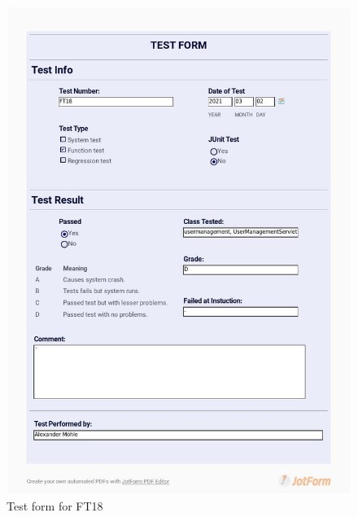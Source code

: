 \documentclass{article}
\begin{document}
 \begin{figure}
     \centering
     \includegraphics[width=13cm]{images/2021-03-02_Alexander_FT18_001}
     \renewcommand\figurename{Figure}
     \caption{Test form for FT18}
     \label{fig:my_label}
 \end{figure}
 
\end{document}
